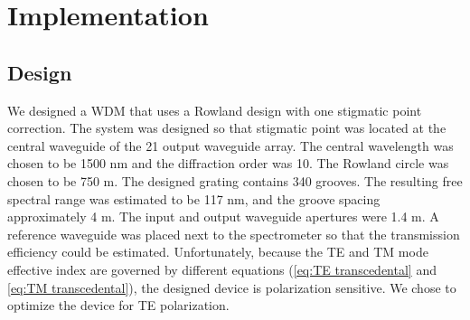 \documentclass[12pt,twoside,english]{book}
\renewcommand{\~}{\perispomeni}%
\DeclareRobustCommand{\textgreek}[1]{\leavevmode{\greektext #1}}
\numberwithin{equation}{section}
\numberwithin{figure}{section}
\begin{document}
\section{Implementation}
\label{section:implementation}




\subsection{Design}
We designed a \gls{WDM} that uses a Rowland design with one stigmatic point correction. The system was designed so that stigmatic point was located at the central waveguide of the 21 output waveguide array. The central wavelength was chosen to be 1500 nm and the diffraction order was 10. The Rowland circle was chosen to be 750 \textgreek{m}m. The designed grating contains 340 grooves. The resulting free spectral range was estimated to be 117 nm, and the groove spacing approximately 4 \textgreek{m}m. The input and output waveguide apertures were 1.4 \textgreek{m}m. A reference waveguide was placed next to the spectrometer so that the transmission efficiency could be estimated. Unfortunately, because the TE and TM mode effective index are governed by different equations (\ref{eq:TE transcedental} and \ref{eq:TM transcedental}), the designed device is polarization sensitive. We chose to optimize the device for TE polarization.
\end{document}
